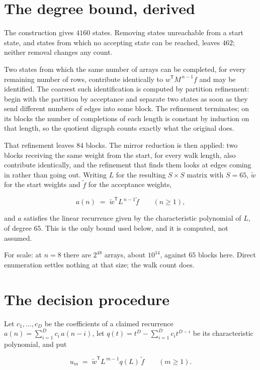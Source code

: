 \documentclass[11pt]{article}
\theoremstyle{definition}
\begin{document}
\section{The degree bound, derived}

The construction gives $4160$ states. Removing states unreachable from a start state, and states from which no accepting state can be reached, leaves $462$; neither removal changes any count.

Two states from which the same number of arrays can be completed, for every remaining number of rows, contribute identically to $w^{\mathsf T}M^{\,n-1}f$ and may be identified. The coarsest such identification is computed by partition refinement: begin with the partition by acceptance and separate two states as soon as they send different numbers of edges into some block. The refinement terminates; on its blocks the number of completions of each length is constant by induction on that length, so the quotient digraph counts exactly what the original does.

That refinement leaves $84$ blocks. The mirror reduction is then applied: two blocks receiving the same weight from the start, for every walk length, also contribute identically, and the refinement that finds them looks at edges coming in rather than going out. Writing $L$ for the resulting $S \times S$ matrix with $S = 65$, $\tilde w$ for the start weights and $\tilde f$ for the acceptance weights,

\[a(n) \;=\; \tilde w^{\mathsf T} L^{\,n-1} \tilde f \qquad (n \ge 1),\]

and $a$ satisfies the linear recurrence given by the characteristic polynomial of $L$, of degree $65$. This is the only bound used below, and it is computed, not assumed.

For scale: at $n = 8$ there are $2^{48}$ arrays, about $10^{14}$, against $65$ blocks here. Direct enumeration settles nothing at that size; the walk count does.

\section{The decision procedure}

Let $c_1,\dots,c_D$ be the coefficients of a claimed recurrence $a(n) = \sum_{i=1}^{D} c_i\,a(n-i)$, let $q(t) = t^{D} - \sum_{i=1}^{D} c_i t^{D-i}$ be its characteristic polynomial, and put

\[u_m \;=\; \tilde w^{\mathsf T} L^{\,m-1} q(L)\,\tilde f \qquad (m \ge 1).\]
\end{document}
